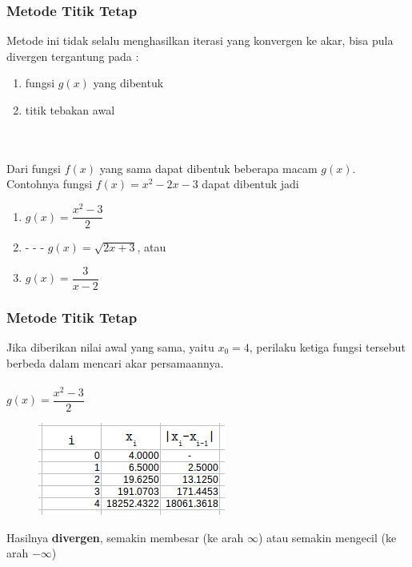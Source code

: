 \documentclass{beamer}
\begin{document}

\begin{frame}
\frametitle{Metode Titik Tetap}
Metode ini tidak selalu menghasilkan iterasi yang konvergen ke akar, bisa pula divergen tergantung pada :
\begin{enumerate}
\item fungsi $g(x)$ yang dibentuk
\item titik tebakan awal
\end{enumerate}
\ \\\ \\Dari fungsi $f(x)$ yang sama dapat dibentuk beberapa macam $g(x)$. Contohnya fungsi $f(x) = x^2-2x-3$ dapat dibentuk jadi
\begin{enumerate}
\item $g(x) = \dfrac{x^2-3}{2}$
\item \qquad - \qquad - \qquad - \qquad $g(x) = \sqrt{2x+3}$, atau
\item $g(x) = \dfrac{3}{x-2}$
\end{enumerate}
\end{frame}


\begin{frame}
\frametitle{Metode Titik Tetap}
Jika diberikan nilai awal yang sama, yaitu $x_0 = 4$, perilaku ketiga fungsi tersebut berbeda dalam mencari akar persamaannya.
\\\ \\$g(x) = \dfrac{x^2-3}{2}$
\begin{figure}[htp]
\centering
\includegraphics[scale=0.80]{TTver1.png}
\end{figure}
Hasilnya \textbf{divergen}, semakin membesar (ke arah $\infty$) atau semakin mengecil (ke arah $-\infty$)
\end{frame}

\end{document}
